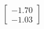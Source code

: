 \documentclass[preview]{standalone}
\begin{document}
\begin{align*}
\begin{bmatrix} -1.70 \\ -1.03 \end{bmatrix}
\end{align*}
\end{document}
